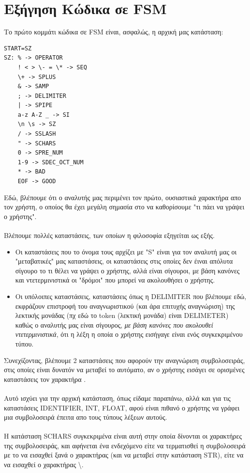\documentclass[14pt]{extarticle}
\begin{document}
\section{Εξήγηση Κώδικα σε \textlatin{FSM}}
Το πρώτο κομμάτι κώδικα σε \textlatin{FSM} είναι, ασφαλώς, η αρχική μας κατάσταση:
    \begin{lstlisting}
START=SZ
SZ: % -> OPERATOR
    ! < > \- = \* -> SEQ
    \+ -> SPLUS
    & -> SAMP
    ; -> DELIMITER
    | -> SPIPE
    a-z A-Z _ -> SI
    \n \s -> SZ
    / -> SSLASH
    " -> SCHARS
    0 -> SPRE_NUM
    1-9 -> SDEC_OCT_NUM
    * -> BAD
    EOF -> GOOD
    \end{lstlisting}
Εδώ, βλέπουμε ότι ο αναλυτής μας περιμένει τον πρώτο, ουσιαστικά χαρακτήρα απο τον χρήστη, ο οποίος θα έχει μεγάλη σημασία στο να καθορίσουμε "τι πάει να γράψει ο χρήστης".
\\
\\
Βλέπουμε πολλές καταστάσεις, των οποίων η φιλοσοφία εξηγείται ως εξής.
\begin{itemize}
  \item Οι καταστάσεις που το όνομα τους αρχίζει με \textlatin{"S"} είναι για τον αναλυτή μας οι "μεταβατικές" μας καταστάσεις, οι καταστάσεις στις οποίες δεν έιναι απόλυτα σίγουρο το τι θέλει να γράψει ο χρήστης, αλλά είναι σίγουροι, με βάση κανόνες και ντετερμινιστικά οι "δρόμοι" που μπορεί να ακολουθήσει ο χρήστης. 
  \item Οι υπόλοιπες καταστάσεις, καταστάσεις όπως η \textlatin{DELIMITER} που βλέπουμε εδώ, εκφράζουν επιστροφή του αναγνωριστικού (και άρα επιτυχής αναγνώριση) της λεκτικής μονάδας (πχ εδώ το \textlatin{token} (λεκτική μονάδα) είναι \textlatin{DELIMETER}) καθώς ο αναλυτής μας είναι σίγουρος, \emph{με βάση κανόνες που ακολουθεί ντετερμινιστικά}, ότι η λέξη η οποία ο χρήστης εισήγαγε είναι ενός συγκεκριμένου τύπου.  
\end{itemize}
\clearpage
Συνεχίζοντας, βλέπουμε 2 καταστάσεις που αφορούν την αναγνώριση συμβολοσειράς, στις οποίες είναι δυνατόν να μεταβεί το αυτόματο, αν ο χρήστης εισάγει σε ορισμένες καταστάσεις τον χαρακτήρα .
\\
\\
Αυτό ισχύει για την αρχική κατάσταση, όπως είδαμε παραπάνω, αλλά και για τις καταστάσεις \textlatin{IDENTIFIER, INT, FLOAT}, αφού είναι πιθανό ο χρήστης να γράφει μια συμβολοσειρά έπειτα απο τους τύπους λέξεων αυτούς.
\\
\\
Η κατάσταση \textlatin{SCHARS} συγκεκριμένα είναι αυτή στην οποία δίνονται οι χαρακτήρες της συμβολοσειράς, και αφήνεται ένα ενδεχόμενο είτε να τερματισθεί η συμβολοσειρά με το να εισαχθεί ξανά ο χαρακτήρας  (και να μεταβεί στην κατάσταση \textlatin{STR}), είτε να να εισαχθεί ο χαρακτήρας \textbackslash.
\end{document}

